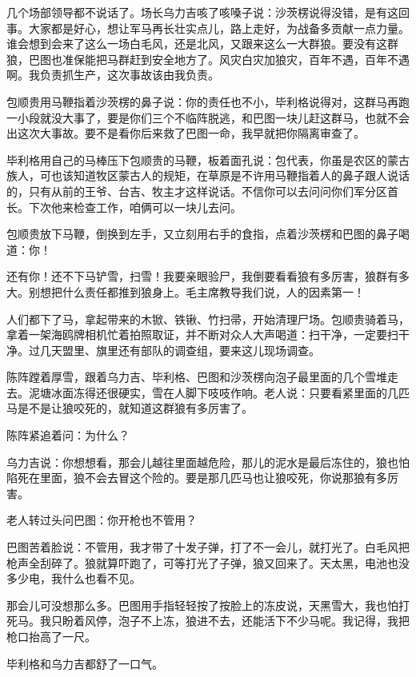 \par 几个场部领导都不说话了。场长乌力吉咳了咳嗓子说：沙茨楞说得没错，是有这回事。大家都是好心，想让军马再长壮实点儿，路上走好，为战备多贡献一点力量。谁会想到会来了这么一场白毛风，还是北风，又跟来这么一大群狼。要没有这群狼，巴图也准保能把马群赶到安全地方了。风灾白灾加狼灾，百年不遇，百年不遇啊。我负责抓生产，这次事故该由我负责。
\par 包顺贵用马鞭指着沙茨楞的鼻子说：你的责任也不小，毕利格说得对，这群马再跑一小段就没大事了，要是你们三个不临阵脱逃，和巴图一块儿赶这群马，也就不会出这次大事故。要不是看你后来救了巴图一命，我早就把你隔离审查了。
\par 毕利格用自己的马棒压下包顺贵的马鞭，板着面孔说：包代表，你虽是农区的蒙古族人，可也该知道牧区蒙古人的规矩，在草原是不许用马鞭指着人的鼻子跟人说话的，只有从前的王爷、台吉、牧主才这样说话。不信你可以去问问你们军分区首长。下次他来检查工作，咱俩可以一块儿去问。
\par 包顺贵放下马鞭，倒换到左手，又立刻用右手的食指，点着沙茨楞和巴图的鼻子喝道：你！
\par 还有你！还不下马铲雪，扫雪！我要亲眼验尸，我倒要看看狼有多厉害，狼群有多大。别想把什么责任都推到狼身上。毛主席教导我们说，人的因素第一！
\par 人们都下了马，拿起带来的木锨、铁锹、竹扫帚，开始清理尸场。包顺贵骑着马，拿着一架海鸥牌相机忙着拍照取证，并不断对众人大声喝道：扫干净，一定要扫干净。过几天盟里、旗里还有部队的调查组，要来这儿现场调查。
\par 陈阵蹚着厚雪，跟着乌力吉、毕利格、巴图和沙茨楞向泡子最里面的几个雪堆走去。泥塘冰面冻得还很硬实，雪在人脚下吱吱作响。老人说：只要看紧里面的几匹马是不是让狼咬死的，就知道这群狼有多厉害了。
\par 陈阵紧追着问：为什么？
\par 乌力吉说：你想想看，那会儿越往里面越危险，那儿的泥水是最后冻住的，狼也怕陷死在里面，狼不会去冒这个险的。要是那几匹马也让狼咬死，你说那狼有多厉害。
\par 老人转过头问巴图：你开枪也不管用？
\par 巴图苦着脸说：不管用，我才带了十发子弹，打了不一会儿，就打光了。白毛风把枪声全刮碎了。狼就算吓跑了，可等打光了子弹，狼又回来了。天太黑，电池也没多少电，我什么也看不见。
\par 那会儿可没想那么多。巴图用手指轻轻按了按脸上的冻皮说，天黑雪大，我也怕打死马。我只盼着风停，泡子不上冻，狼进不去，还能活下不少马呢。我记得，我把枪口抬高了一尺。
\par 毕利格和乌力吉都舒了一口气。
